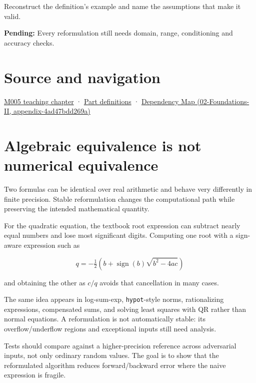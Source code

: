 Reconstruct the definition's example and name the assumptions that make it valid.

\textbf{Pending:} Every reformulation still needs domain, range, conditioning and accuracy checks.

\section{Source and navigation}\label{appendix-d7f8ba961670-source-and-navigation}

\href{Continuous\%20Notes/Computing\%20Foundations\%20-\%20From\%20Bits\%20to\%20C++\%20and\%20Systems\%20APIs\#When\%20arithmetic\%20meets\%20uncertainty}{M005 teaching chapter} · \hyperref[appendix-fd090d982a15-m005---parts-77-88]{Part definitions} · \href{../02-Foundations-II/main.pdf\#nameddest=appendix-4ad47bdd269a}{Dependency Map (02-Foundations-II, appendix-4ad47bdd269a)}

\section{Algebraic equivalence is not numerical equivalence}\label{appendix-d7f8ba961670-algebraic-equivalence-is-not-numerical-equivalence}

Two formulas can be identical over real arithmetic and behave very differently in finite precision. Stable reformulation changes the computational path while preserving the intended mathematical quantity.

For the quadratic equation, the textbook root expression can subtract nearly equal numbers and lose most significant digits. Computing one root with a sign-aware expression such as

\[
q=-\tfrac12\left(b+\operatorname{sign}(b)\sqrt{b^2-4ac}\right)
\]

and obtaining the other as \(c/q\) avoids that cancellation in many cases.

The same idea appears in log-sum-exp, \texttt{hypot}-style norms, rationalizing expressions, compensated sums, and solving least squares with QR rather than normal equations. A reformulation is not automatically stable: its overflow/underflow regions and exceptional inputs still need analysis.

Tests should compare against a higher-precision reference across adversarial inputs, not only ordinary random values. The goal is to show that the reformulated algorithm reduces forward/backward error where the naive expression is fragile.
